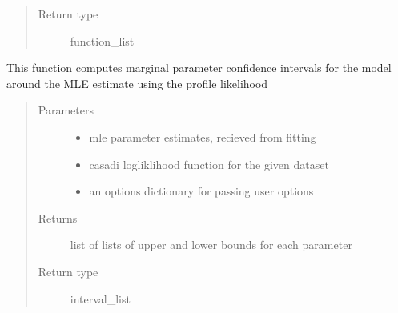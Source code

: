 \documentclass[letterpaper,10pt,english,openany,oneside]{sphinxmanual}
\begin{document}
\begin{fulllineitems}
\begin{fulllineitems}
\begin{quote}
\begin{description}
\begin{description}
\end{description}


\item[{Return type}] \leavevmode
function\_list

\end{description}\end{quote}

\end{fulllineitems}


\begin{fulllineitems}
\label{\detokenize{nloed:nloed.model.Model.__confidence_intervals}}
This function computes marginal parameter confidence intervals for the model
around the MLE estimate using the profile likelihood
\begin{quote}\begin{description}
\item[{Parameters}] \leavevmode\begin{itemize}
\item {} 
 \textendash{} mle parameter estimates,  recieved from fitting

\item {} 
 \textendash{} casadi logliklihood function for the given dataset

\item {} 
 \textendash{} an options dictionary for passing user options

\end{itemize}

\item[{Returns}] \leavevmode
list of lists of upper and lower bounds for each parameter

\item[{Return type}] \leavevmode
interval\_list

\end{description}\end{quote}

\end{fulllineitems}


\end{fulllineitems}
\end{document}
